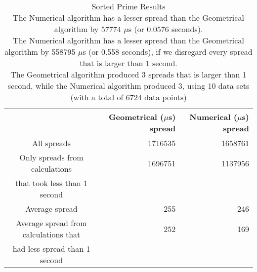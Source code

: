 \begin{table}[bth!]\footnotesize
 \begin{tabular}[3]{c|r|r}
 & Geometrical ($\mu$s) spread & Numerical ($\mu$s) spread\\
\hline
All spreads & 1716535 & 1658761 \\ 
\hline 
Only spreads from calculations & 1696751 & 1137956 \\ 
that took less than 1 second & & \\ 
\hline
Average spread & 255 & 246 \\
\hline
Average spread from calculations that & 252 & 169 \\ 
had less spread than 1 second & & \\ 
\end{tabular}\\ \\
\caption{Sorted Prime Results\\
The Numerical algorithm has a lesser spread than the Geometrical algorithm by 57774 $\mu$s (or 0.0576 seconds).\\
The Numerical algorithm has a lesser spread than the Geometrical algorithm by 558795 $\mu$s (or 0.558 seconds), if we disregard every spread that is larger than 1 second.\\
The Geometrical algorithm produced 3 spreads that is larger than 1 second, while the Numerical algorithm produced 3, using 10 data sets (with a total of 6724 data points)\\
}\label{prime-normal_spreadtable}\end{table}